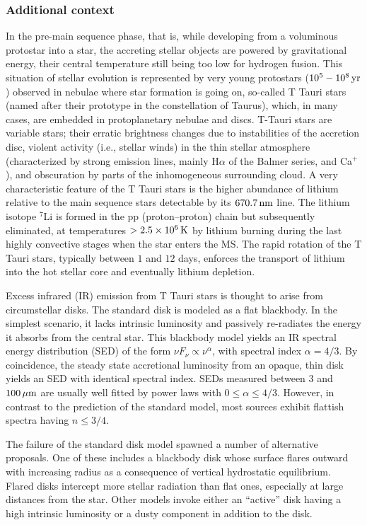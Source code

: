 \documentclass[a4paper,10pt]{article}
\begin{document}
\subsubsection{Additional context}

In the pre-main sequence phase, that is, while developing from a voluminous protostar into a star, the accreting stellar objects are powered by gravitational energy, their central temperature still being too low for hydrogen fusion. This situation of stellar evolution is represented by very young protostars ($10^5-10^8\,{\rm yr}$) observed in nebulae where star formation is going on, so-called T Tauri stars (named after their prototype in the constellation of Taurus), which, in many cases, are embedded in protoplanetary nebulae and discs. T-Tauri stars are variable stars; their erratic brightness changes due to instabilities of the accretion disc, violent activity (i.e., stellar winds) in the thin stellar atmosphere (characterized by strong emission lines, mainly H$\alpha$ of the Balmer series, and Ca$^+$), and obscuration by parts of the inhomogeneous surrounding cloud. A very characteristic feature of the T Tauri stars is the higher abundance of lithium relative to the main sequence stars detectable by its $670.7\,{\rm nm}$ line. The lithium isotope $^7$Li is formed in the pp (proton–proton) chain but subsequently eliminated, at temperatures $>2.5\times10^6\,{\rm K}$ by lithium burning during the last highly convective stages when the star enters the MS. The rapid rotation of the T Tauri stars, typically between $1$ and $12$ days, enforces the transport of lithium into the hot stellar core and eventually lithium depletion.

{\noindent}Excess infrared (IR) emission from T Tauri stars is thought to arise from circumstellar disks. The standard disk is modeled as a flat blackbody. In the simplest scenario, it lacks intrinsic luminosity and passively re-radiates the energy it absorbs from the central star. This blackbody model yields an IR spectral energy distribution (SED) of the form $\nu F_\nu\propto\nu^\alpha$, with spectral index $\alpha=4/3$. By coincidence, the steady state accretional luminosity from an opaque, thin disk yields an SED with identical spectral index. SEDs measured between $3$ and $100\,\mu{\rm m}$ are usually well fitted by power laws with $0\leq\alpha\leq4/3$. However, in contrast to the prediction of the standard model, most sources exhibit flattish spectra having $n\leq3/4$. 

{\noindent}The failure of the standard disk model spawned a number of alternative proposals. One of these includes a blackbody disk whose surface flares outward with increasing radius as a consequence of vertical hydrostatic equilibrium. Flared disks intercept more stellar radiation than flat ones, especially at large distances from the star. Other models invoke either an ``active'' disk having a high intrinsic luminosity or a dusty component in addition to the disk.
\end{document}
